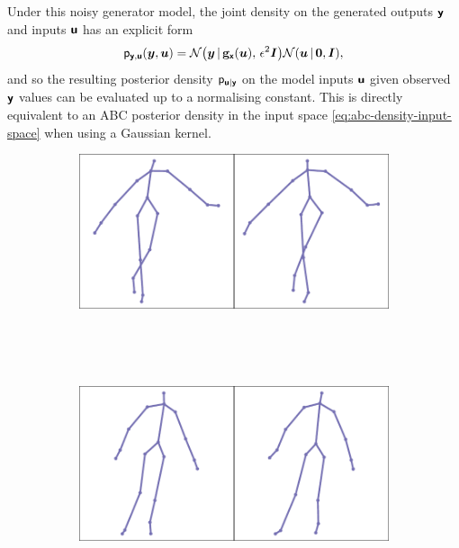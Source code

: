 Under this noisy generator model, the joint density on the generated outputs $\boldsymbol{\mathsf{y}}$ and inputs $\boldsymbol{\mathsf{u}}$ has an explicit form
\begin{equation}
  \pden{\rvct{y},\rvct{u}}(\vct{y},\vct{u}) = 
  \nrm{\vct{y}\gvn\genfunc_{\rvct{x}}(\vct{u}),\,\epsilon^2 \mtx{I}}
  \nrm{\vct{u} \gvn \vct{0},\mtx{I}},
\end{equation}
and so the resulting posterior density $\mathsf{p}_{\boldsymbol{\mathsf{u}}|\boldsymbol{\mathsf{y}}}$ on the model inputs $\boldsymbol{\mathsf{u}}$ given observed $\boldsymbol{\mathsf{y}}$ values can be evaluated up to a normalising constant. This is directly equivalent to an \ac{ABC} posterior density in the input space \eqref{eq:abc-density-input-space} when using a Gaussian kernel.

\begin{figure}
\centering
\begin{subfigure}[b]{0.4\textwidth}
  \includegraphics[width=\textwidth]{images/binocular-pose-obs-1.pdf}
  \vspace{1cm}
\end{subfigure}
~~
\begin{subfigure}[b]{0.55\textwidth}
\end{subfigure}
\\[5mm]
\begin{subfigure}[b]{0.4\textwidth}
  \includegraphics[width=\textwidth]{images/binocular-pose-obs-2.pdf}

\end{subfigure}
\end{figure}
